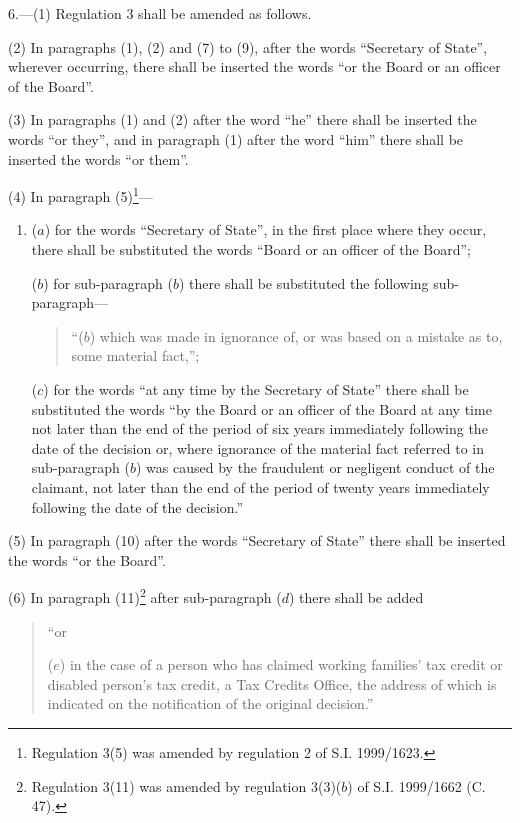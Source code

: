 \documentclass[12pt,a4paper]{article}
\begin{document}
\medskip

6.---(1)  Regulation 3 shall be amended as follows.

(2) In paragraphs (1), (2) and (7) to (9), after the words “Secretary of State”, wherever occurring, there shall be inserted the words “or the Board or an officer of the Board”.

(3) In paragraphs (1) and (2) after the word “he” there shall be inserted the words “or they”, and in paragraph (1) after the word “him” there shall be inserted the words “or them”.

(4) In paragraph (5)\footnote{\frenchspacing Regulation 3(5) was amended by regulation 2 of S.I. 1999/1623.}—
\begin{enumerate}\item[]
($a$) for the words “Secretary of State”, in the first place where they occur, there shall be substituted the words “Board or an officer of the Board”;

($b$) for sub-paragraph ($b$)  there shall be substituted the following sub-paragraph—
\begin{quotation}
“($b$) which was made in ignorance of, or was based on a mistake as to, some material 
fact,”;
\end{quotation}

($c$) for the words “at any time by the Secretary of State” there shall be substituted the words “by the Board or an officer of the Board at any time not later than the end of the period of six years immediately following the date of the decision or, where ignorance of the material fact referred to in sub-paragraph ($b$)  was caused by the fraudulent or negligent conduct of the claimant, not later than the end of the period of twenty years immediately following the date of the decision.”
\end{enumerate}

(5) In paragraph (10) after the words “Secretary of State” there shall be inserted the words “or the Board”.

(6) In paragraph (11)\footnote{\frenchspacing Regulation 3(11) was amended by regulation 3(3)($b$) of S.I. 1999/1662 (C. 47).} after sub-paragraph ($d$)  there shall be added
\begin{quotation}
“or

($e$) in the case of a person who has claimed working families' tax credit or disabled person’s tax credit, a Tax Credits Office, the address of which is indicated on the notification of the original decision.”
\end{quotation}
\end{document}
